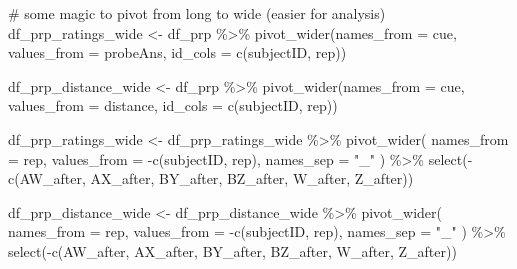\documentclass[
  letterpaper,
  DIV=11,
  numbers=noendperiod]{scrartcl}
\newenvironment{Shaded}{\begin{snugshade}}{\end{snugshade}}
\newcommand{\AttributeTok}[1]{\textcolor[rgb]{0.40,0.45,0.13}{#1}}
\newcommand{\CommentTok}[1]{\textcolor[rgb]{0.37,0.37,0.37}{#1}}
\newcommand{\FunctionTok}[1]{\textcolor[rgb]{0.28,0.35,0.67}{#1}}
\newcommand{\NormalTok}[1]{\textcolor[rgb]{0.00,0.23,0.31}{#1}}
\newcommand{\OtherTok}[1]{\textcolor[rgb]{0.00,0.23,0.31}{#1}}
\newcommand{\SpecialCharTok}[1]{\textcolor[rgb]{0.37,0.37,0.37}{#1}}
\newcommand{\StringTok}[1]{\textcolor[rgb]{0.13,0.47,0.30}{#1}}
\begin{document}
\begin{Shaded}
\begin{Highlighting}[]
\CommentTok{\# some magic to pivot from long to wide (easier for analysis)}
\NormalTok{df\_prp\_ratings\_wide }\OtherTok{\textless{}{-}}\NormalTok{ df\_prp }\SpecialCharTok{\%\textgreater{}\%}
  \FunctionTok{pivot\_wider}\NormalTok{(}\AttributeTok{names\_from =}\NormalTok{ cue, }\AttributeTok{values\_from =}\NormalTok{ probeAns, }\AttributeTok{id\_cols =} \FunctionTok{c}\NormalTok{(subjectID, rep))}

\NormalTok{df\_prp\_distance\_wide }\OtherTok{\textless{}{-}}\NormalTok{ df\_prp }\SpecialCharTok{\%\textgreater{}\%}
  \FunctionTok{pivot\_wider}\NormalTok{(}\AttributeTok{names\_from =}\NormalTok{ cue, }\AttributeTok{values\_from =}\NormalTok{ distance, }\AttributeTok{id\_cols =} \FunctionTok{c}\NormalTok{(subjectID, rep))}

\NormalTok{df\_prp\_ratings\_wide }\OtherTok{\textless{}{-}}\NormalTok{ df\_prp\_ratings\_wide }\SpecialCharTok{\%\textgreater{}\%}
  \FunctionTok{pivot\_wider}\NormalTok{(}
    \AttributeTok{names\_from =}\NormalTok{ rep,        }
    \AttributeTok{values\_from =} \SpecialCharTok{{-}}\FunctionTok{c}\NormalTok{(subjectID, rep), }
    \AttributeTok{names\_sep =} \StringTok{"\_"}           
\NormalTok{  ) }\SpecialCharTok{\%\textgreater{}\%}
  \FunctionTok{select}\NormalTok{(}\SpecialCharTok{{-}}\FunctionTok{c}\NormalTok{(}\StringTok{\textquotesingle{}AW\_after\textquotesingle{}}\NormalTok{, }\StringTok{\textquotesingle{}AX\_after\textquotesingle{}}\NormalTok{, }\StringTok{\textquotesingle{}BY\_after\textquotesingle{}}\NormalTok{, }\StringTok{\textquotesingle{}BZ\_after\textquotesingle{}}\NormalTok{, }\StringTok{\textquotesingle{}W\_after\textquotesingle{}}\NormalTok{, }\StringTok{\textquotesingle{}Z\_after\textquotesingle{}}\NormalTok{))}

\NormalTok{df\_prp\_distance\_wide }\OtherTok{\textless{}{-}}\NormalTok{ df\_prp\_distance\_wide }\SpecialCharTok{\%\textgreater{}\%}
  \FunctionTok{pivot\_wider}\NormalTok{(}
    \AttributeTok{names\_from =}\NormalTok{ rep,}
    \AttributeTok{values\_from =} \SpecialCharTok{{-}}\FunctionTok{c}\NormalTok{(subjectID, rep),}
    \AttributeTok{names\_sep =} \StringTok{"\_"}      
\NormalTok{  ) }\SpecialCharTok{\%\textgreater{}\%}
  \FunctionTok{select}\NormalTok{(}\SpecialCharTok{{-}}\FunctionTok{c}\NormalTok{(}\StringTok{\textquotesingle{}AW\_after\textquotesingle{}}\NormalTok{, }\StringTok{\textquotesingle{}AX\_after\textquotesingle{}}\NormalTok{, }\StringTok{\textquotesingle{}BY\_after\textquotesingle{}}\NormalTok{, }\StringTok{\textquotesingle{}BZ\_after\textquotesingle{}}\NormalTok{, }\StringTok{\textquotesingle{}W\_after\textquotesingle{}}\NormalTok{, }\StringTok{\textquotesingle{}Z\_after\textquotesingle{}}\NormalTok{))}
\end{Highlighting}
\end{Shaded}
\end{document}
